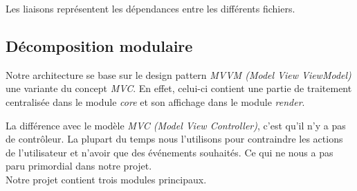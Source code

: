 \documentclass[17pts]{report}
\begin{document}
Les liaisons représentent les dépendances entre les différents fichiers.

\subsection{Décomposition modulaire}
\label{sub:Décomposition modulaire}
Notre architecture se base sur le design pattern \textit{MVVM (Model View
ViewModel)} une variante du concept \textit{MVC}. En effet, celui-ci contient
une partie de traitement centralisée dans le module \textit{core} et son
affichage dans le module \textit{render}.

La différence avec le modèle \textit{MVC (Model View Controller)}, c'est qu'il
n'y a pas de contrôleur.  La plupart du temps nous l'utilisons pour contraindre
les actions de l'utilisateur et n'avoir que des événements souhaités. Ce qui ne
nous a pas paru primordial dans notre projet.\\
Notre projet contient trois modules principaux.
\end{document}
